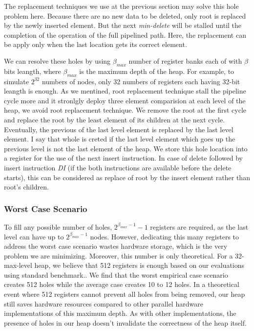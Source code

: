 The replacement techniques we use at the previous section may solve this hole problem here. 
Because there are no new data to be deleted, only root is replaced by the newly inserted element. 
But the next {\it min-delete} will be stalled until the completion of the operation of the full pipelined path. 
Here, the replacement can be apply only when the last location gets its correct element.

We can resolve these holes by using $\beta_{max}$ number of register banks each of with $\beta$ bits leangth, where $\beta_{max}$ is the maximum depth of the heap. For example, to simulate $2^{32}$ numbers of nodes, only 32 numbers of registers each having 32-bit leangth is enough. As we mentined, root replacement technique stall the pipeline cycle more and it stronlgly deploy three element comparision at each level of the heap, we avoid root replacement technique. We remove the root at the first cycle and replace the root by the least element of its children at the next cycle. Eventually, the previous of the last level element is replaced by the last level element. I say that whole is creted if the last level element which goes up the previous level is not the last element of the heap. We store this hole location into a register for the use of the next insert instruction. In case of delete followed by insert instruction {\it DI} (if the both instructions are available before the delete starts), this can be considered as replace of root by the insert element rather than root's children.

\subsubsection{Worst Case Scenario}
To fill any possible number of holes, $2^{\beta_{max}-1} - 1$ registers are required, as the last level can have up to $2^{\beta_{max}-1}$ nodes. 
However, dedicating this many registers to address the worst case scenario wastes hardware storage, which is the very problem we are minimizing. 
Moreover, this number is only theoretical.
For a 32-max-level heap, we believe that 512 registers is enough based on our evaluations using standard benchmark..
We find that the worst empirical case scenario creates 512 holes while the average case creates 10 to 12 holes.
In a theoretical event where 512 registers cannot prevent all holes from being removed, our heap still saves hardware resources compared to other parallel hardware implementations of this maximum depth. 
As with other implementations, the presence of holes in our heap doesn't invalidate the correctness of the heap itself.

